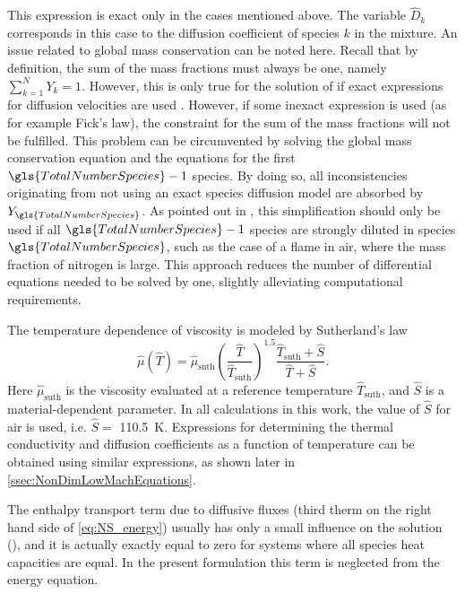 This expression is exact only in the cases mentioned above. The variable $\hat D_k$ corresponds in this case to the diffusion coefficient of species $k$ in the mixture. An issue related to global mass conservation can be noted here. Recall that by definition, the sum of the mass fractions must always be one, namely $ \sum_{k=1}^{N}Y_k = 1$. However, this is only true for the solution of  if exact expressions for diffusion velocities are used \parencite{poinsotTheoreticalNumericalCombustion2011}. However, if some inexact expression is used (as for example Fick's law), the constraint for the sum of the mass fractions will not be fulfilled. This problem can be circumvented by solving the global mass conservation equation and  the equations for the first $\gls{TotalNumberSpecies} - 1$ species. By doing so, all inconsistencies originating from not using an exact species diffusion model are absorbed by $Y_{\gls{TotalNumberSpecies}}$. As pointed out in \textcite{poinsotTheoreticalNumericalCombustion2011}, this simplification should only be used if all $\gls{TotalNumberSpecies}-1$ species are strongly diluted in species $\gls{TotalNumberSpecies}$, such as the case of a flame in air, where the mass fraction of nitrogen is large. This approach reduces the number of differential equations needed to be solved by one, slightly alleviating computational requirements.

The temperature dependence of viscosity is modeled by Sutherland's law \parencite{sutherlandLIIViscosityGases1893}
\begin{equation}\label{eq:DimSutherland}
	\hat{\mu}(\hat{T}) = \hat{\mu}_{\text{suth}}\left(\frac{\hat{T}}{\hat{T}_{\text{suth}}}\right)^{1.5}\frac{\hat{T}_{\text{suth}} + \hat{S}}{\hat{T}+\hat{S}}.
\end{equation}
Here $\hat{\mu}_{\text{suth}}$ is the viscosity evaluated at a reference temperature $\hat{T}_{\text{suth}}$, and $\hat S$ is a material-dependent parameter. In all calculations in this work, the value of $\hat{S}$ for air is used, i.e. $\hat{S} = $ \SI{110.5}{\kelvin}. Expressions for determining the thermal conductivity and diffusion coefficients as a function of temperature can be obtained using similar expressions, as shown later in \cref{ssec:NonDimLowMachEquations}.

The enthalpy transport term due to diffusive fluxes (third therm on the right hand side of \cref{eq:NS_energy}) usually has only a small influence on the solution (\textcite{smokeFormulationPremixedNonpremixed1991, goeyModelingSmallScale1995,paxionDevelopmentParallelUnstructured2001}), and it is actually exactly equal to zero for systems where all species heat capacities are equal. In the present formulation this term is neglected from the energy equation. 


